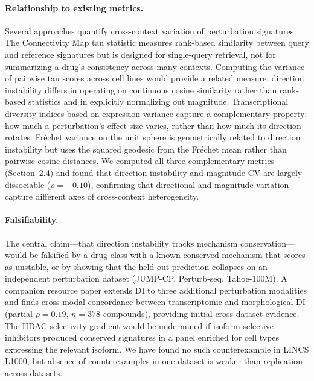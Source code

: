 \documentclass[11pt]{article}
\begin{document}
\paragraph{Relationship to existing metrics.}
Several approaches quantify cross-context variation of perturbation
signatures.  The Connectivity Map tau statistic
\citep{subramanian2017next} measures rank-based similarity between
query and reference signatures but is designed for single-query
retrieval, not for summarizing a drug's consistency across many
contexts.  Computing the variance of pairwise tau scores across cell
lines would provide a related measure; direction instability differs
in operating on continuous cosine similarity rather than rank-based
statistics and in explicitly normalizing out magnitude.  Transcriptional
diversity indices based on expression variance
\citep{haghighi2022high} capture a complementary property: how much a
perturbation's effect size varies, rather than how much its direction
rotates.  Fr\'echet variance on the unit sphere
\citep{pennec2006intrinsic} is geometrically related to direction
instability but uses the squared geodesic from the Fr\'echet mean
rather than pairwise cosine distances.  We computed all three
complementary metrics (Section~2.4) and found that direction
instability and magnitude CV are largely dissociable ($\rho = -0.10$),
confirming that directional and magnitude variation capture different
axes of cross-context heterogeneity.

\paragraph{Falsifiability.}
The central claim---that direction instability tracks mechanism
conservation---would be falsified by a drug class with a known
conserved mechanism that scores as unstable, or by showing that the
held-out prediction collapses on an independent perturbation dataset
(JUMP-CP, Perturb-seq, Tahoe-100M).  A companion resource paper
extends DI to three additional perturbation modalities and finds
cross-modal concordance between transcriptomic and morphological DI
(partial $\rho = 0.19$, $n = 378$ compounds), providing initial
cross-dataset evidence.  The HDAC selectivity gradient would be
undermined if isoform-selective inhibitors produced conserved
signatures in a panel enriched for cell types expressing the relevant
isoform.  We have found no such counterexample in LINCS L1000, but
absence of counterexamples in one dataset is weaker than replication
across datasets.
\end{document}
